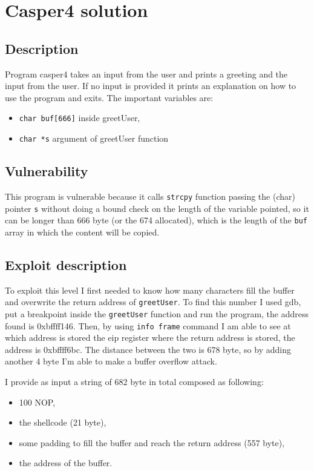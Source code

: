 \documentclass[a4paper,12pt]{article}
\begin{document}
\newpage
\section{Casper4 solution}
\subsection{Description}
Program casper4 takes an input from the user and prints a greeting and the input from the user. If no input is provided it prints an explanation on how to use the program and exits. The important variables are:
\begin{itemize}
\item \texttt{char buf[666]} inside greetUser,
\item \texttt{char *s} argument of greetUser function
\end{itemize}
 

\subsection{Vulnerability}

This program is vulnerable because it calls \texttt{strcpy} function passing the (char) pointer \texttt{s} without doing a bound check on the length of the variable pointed, so it can be longer than 666 byte (or the 674 allocated), which is the length of the \texttt{buf} array in which the content will be copied.

\subsection{Exploit description}

To exploit this level I first needed to know how many characters fill the buffer and overwrite the return address of \texttt{greetUser}. To find this number I used gdb, put a breakpoint inside the \texttt{greetUser} function and run the program, the address found is 0xbffff146. Then, by using \texttt{info frame} command I am able to see at which address is stored the eip register where the return address is stored, the address is 0xbffff6bc. The distance between the two is 678 byte, so by adding another 4 byte I'm able to make a buffer overflow attack.

I provide as input a string of 682 byte in total composed as following:
\begin{itemize}
\item 100 NOP,
\item the shellcode (21 byte),
\item some padding to fill the buffer and reach the return address (557 byte),
\item the address of the buffer.
\end{itemize}
\end{document}
